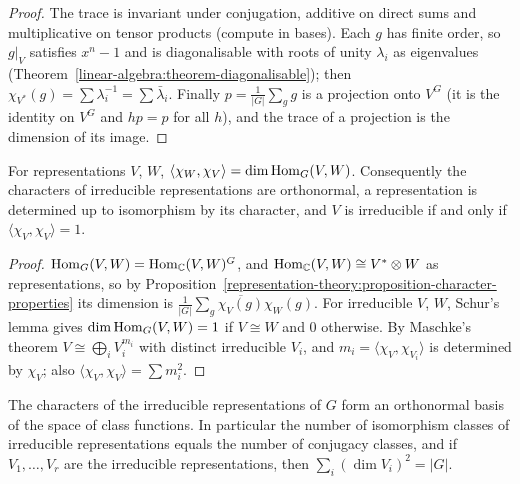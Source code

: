\begin{proof}
The trace is invariant under conjugation, additive on direct sums and multiplicative on tensor products
(compute in bases). Each $g$ has finite order, so $g|_V$ satisfies $x^n - 1$ and is diagonalisable with roots of
unity $\lambda_i$ as eigenvalues (Theorem~\ref{linear-algebra:theorem-diagonalisable}); then
$\chi_{V^*}(g) = \sum \lambda_i^{-1} = \sum \bar\lambda_i$. Finally $p = \frac{1}{|G|}\sum_g g$ is a projection onto $V^G$
(it is the identity on $V^G$ and $hp = p$ for all $h$), and the trace of a projection is the dimension of its
image.
\end{proof}

\begin{theorem}[Orthogonality]\label{representation-theory:theorem-orthogonality}
For representations $V$, $W$, $\langle \chi_W, \chi_V \rangle = \dim \operatorname{Hom}_G(V, W)$. Consequently the characters of
irreducible representations are orthonormal, a representation is determined up to isomorphism by its
character, and $V$ is irreducible if and only if $\langle \chi_V, \chi_V \rangle = 1$.
\end{theorem}

\begin{proof}
$\operatorname{Hom}_G(V, W) = \operatorname{Hom}_{\mathbb{C}}(V, W)^G$, and $\operatorname{Hom}_{\mathbb{C}}(V, W) \cong V^* \otimes W$ as representations, so by
Proposition~\ref{representation-theory:proposition-character-properties} its dimension is
$\frac{1}{|G|}\sum_g \overline{\chi_V(g)}\chi_W(g)$. For irreducible $V$, $W$, Schur's lemma gives
$\dim\operatorname{Hom}_G(V, W) = 1$ if $V \cong W$ and $0$ otherwise. By Maschke's theorem $V \cong \bigoplus_i V_i^{m_i}$ with
distinct irreducible $V_i$, and $m_i = \langle \chi_V, \chi_{V_i} \rangle$ is determined by $\chi_V$; also
$\langle \chi_V, \chi_V \rangle = \sum m_i^2$.
\end{proof}

\begin{theorem}\label{representation-theory:theorem-number-irreducibles}
The characters of the irreducible representations of $G$ form an orthonormal basis of the space of class
functions. In particular the number of isomorphism classes of irreducible representations equals the number
of conjugacy classes, and if $V_1, \ldots, V_r$ are the irreducible representations, then
$\sum_i (\dim V_i)^2 = |G|$.
\end{theorem}

